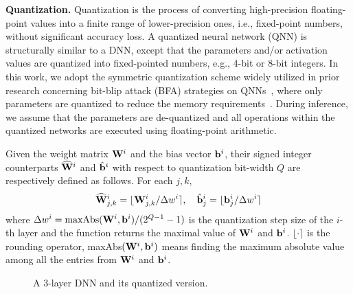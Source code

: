 \smallskip
\noindent
{\bf Quantization.}
% 
Quantization is the process of converting high-precision floating-point values into a finite range of lower-precision ones, i.e., fixed-point numbers, without significant accuracy loss. 
A quantized neural network (QNN) is structurally similar to a DNN, except that the parameters and/or activation values are quantized into fixed-pointed numbers, e.g., 
4-bit or 8-bit integers. 
In this work, we adopt the symmetric quantization scheme widely utilized in prior research concerning bit-blip attack (BFA) strategies on QNNs~\cite{1bitallyouneed}, where only parameters are quantized to reduce the memory requirements~\cite{HanMD15,zhou2022incremental,zhang2023post}. During inference, we assume that the parameters are de-quantized and all operations within the quantized networks are executed using floating-point arithmetic.

Given the weight matrix ${\mathbf{W}}^i$ and the bias vector ${\mathbf{b}}^i$, their signed integer counterparts $\widehat{{\mathbf{W}}}^i$ and $\hat{{\mathbf{b}}}^i$ with respect to quantization bit-width $Q$ are respectively defined as follows. For each $j,k$,
\[
\widehat{{\mathbf{W}}}^i_{j,k} = \lfloor {\mathbf{W}}^i_{j,k}/\Delta w^i \rceil, \quad 
        \hat{{\mathbf{b}}}^i_{j} = \lfloor {\mathbf{b}}^i_{j}/\Delta w^i \rceil
\]
where $\Delta w^i=\text{maxAbs}({\mathbf{W}}^i,{\mathbf{b}}^i)/(2^{Q-1}-1)$ is the quantization step size of the $i$-th layer and the  function returns the maximal value of ${\mathbf{W}}^i$ and ${\mathbf{b}}^i$. $\lfloor \cdot \rceil$ is the rounding operator, maxAbs$({\mathbf{W}}^i,{\mathbf{b}}^i)$ means finding the maximum absolute value among all the entries from ${\mathbf{W}}^i$ and ${\mathbf{b}}^i$. 



\begin{figure*}[t]
	\centering
	\hspace{3mm}
	\caption{A 3-layer DNN  and its quantized version.}
    \label{fig:nnDemo}
\end{figure*}


